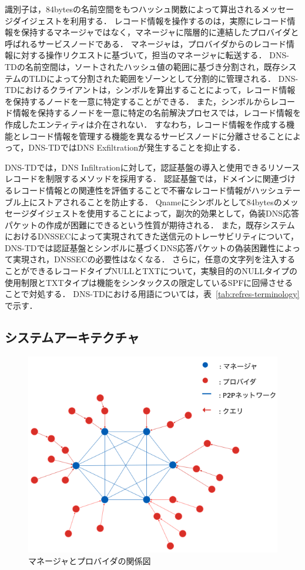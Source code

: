 識別子は，84bytesの名前空間をもつハッシュ関数によって算出されるメッセージダイジェストを利用する．
レコード情報を操作するのは，実際にレコード情報を保持するマネージャではなく，マネージャに階層的に連結したプロバイダと呼ばれるサービスノードである．
マネージャは，プロバイダからのレコード情報に対する操作リクエストに基づいて，担当のマネージャに転送する．
DNS-TDの名前空間は，ソートされたハッシュ値の範囲に基づき分割され，既存システムのTLDによって分割された範囲をゾーンとして分割的に管理される．
DNS-TDにおけるクライアントは，シンボルを算出することによって，レコード情報を保持するノードを一意に特定することができる．
また，シンボルからレコード情報を保持するノードを一意に特定の名前解決プロセスでは，レコード情報を作成したエンティティは介在されない．
すなわち，レコード情報を作成する機能とレコード情報を管理する機能を異なるサービスノードに分離させることによって，DNS-TDではDNS Exfiltrationが発生することを抑止する．

DNS-TDでは，DNS Infiltrationに対して，認証基盤の導入と使用できるリソースレコードを制限するメソッドを採用する．
認証基盤では，ドメインに関連づけるレコード情報との関連性を評価することで不審なレコード情報がハッシュテーブル上にストアされることを防止する．
Qnameにシンボルとして84bytesのメッセージダイジェストを使用することによって，副次的効果として，偽装DNS応答パケットの作成が困難にできるという性質が期待される．
また，既存システムにおけるDNSSECによって実現されてきた送信元のトレーサビリティについて，DNS-TDでは認証基盤とシンボルに基づくDNS応答パケットの偽装困難性によって実現され，DNSSECの必要性はなくなる．
さらに，任意の文字列を注入することができるレコードタイプNULLとTXTについて，実験目的のNULLタイプの使用制限とTXTタイプは機能をシンタックスの限定しているSPFに回帰させることで対処する．
DNS-TDにおける用語については，表~\ref{tab:refres-terminology}で示す．


\newpage
\subsection{システムアーキテクチャ}
\begin{figure}[htbp]
 \centering
 \includegraphics[scale=0.5]{figure/manager-provider.png}
 \caption{マネージャとプロバイダの関係図}
 \label{fig:manager-provider}
\end{figure}

